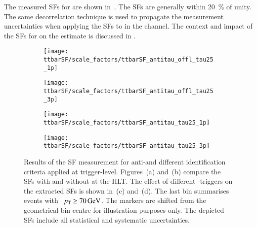 The measured SFs for \antitau are shown in~. The SFs
are generally within \SI{20}{\percent} of unity. The same decorrelation
technique is used to propagate the measurement uncertainties when applying the
SFs to \antitau in the \hadhad channel. The context and impact of the SFs for
\antitau on the \multijet estimate is discussed in .

\begin{figure}[htbp]
  \centering

  \begin{subfigure}[t]{.495\textwidth}
    \texttt{[image: ttbarSF/scale\_factors/ttbarSF\_antitau\_offl\_tau25\_1p]}
    \caption{}
    \label{fig:ttbarSF_antiid_SF_a}
  \end{subfigure}\hfill%
  \begin{subfigure}[t]{.495\textwidth}
    \texttt{[image: ttbarSF/scale\_factors/ttbarSF\_antitau\_offl\_tau25\_3p]}
    \caption{}
    \label{fig:ttbarSF_antiid_SF_b}
  \end{subfigure}

  \begin{subfigure}[t]{.495\textwidth}
    \texttt{[image: ttbarSF/scale\_factors/ttbarSF\_antitau\_tau25\_1p]}
    \caption{}
    \label{fig:ttbarSF_antiid_SF_c}
  \end{subfigure}\hfill%
  \begin{subfigure}[t]{.495\textwidth}
    \texttt{[image: ttbarSF/scale\_factors/ttbarSF\_antitau\_tau25\_3p]}
    \caption{}
    \label{fig:ttbarSF_antiid_SF_d}
  \end{subfigure}

  \caption{Results of the \ttbarFakes SF measurement for anti-\tauhadvis and
    different \tauhadvis identification criteria applied at trigger-level.
    Figures~(a) and~(b) compare the SFs with and without \tauid at the HLT. The
    effect of different \tauhadvis-triggers on the extracted SFs is shown in~(c)
    and~(d). The last bin summarises events with
    \tauhadvis~$\pT \geq \SI{70}{\GeV}$. The markers are shifted from the
    geometrical bin centre for illustration purposes only. The depicted SFs
    include all statistical and systematic uncertainties.}%
  \label{fig:ttbarSF_antiid_SF}
\end{figure}

